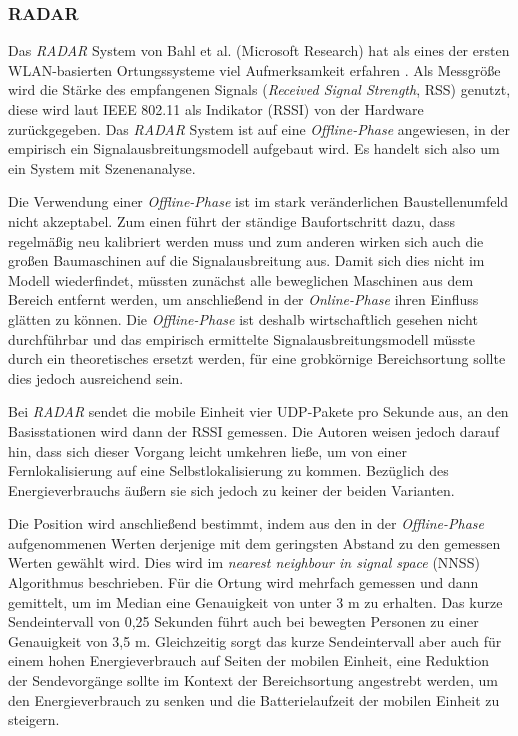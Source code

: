 \subsubsection{RADAR}
\label{ch:Vorherige:sec:RADAR}
Das \emph{RADAR} System von Bahl et al. (Microsoft Research) hat als eines der ersten WLAN-basierten Ortungssysteme viel Aufmerksamkeit erfahren \cite{bahl2000radar}.
Als Messgröße wird die Stärke des empfangenen Signals (\emph{Received Signal Strength}, RSS) genutzt, diese wird laut IEEE 802.11 als Indikator (RSSI) von der Hardware zurückgegeben. 
Das \emph{RADAR} System ist auf eine \emph{Offline-Phase} angewiesen, in der empirisch ein Signalausbreitungsmodell aufgebaut wird. 
Es handelt sich also um ein System mit Szenenanalyse.

Die Verwendung einer \emph{Offline-Phase} ist im stark veränderlichen Baustellenumfeld nicht akzeptabel. 
Zum einen führt der ständige Baufortschritt dazu, dass regelmäßig neu kalibriert werden muss und zum anderen wirken sich auch die großen Baumaschinen auf die Signalausbreitung aus. 
Damit sich dies nicht im Modell wiederfindet, müssten zunächst alle beweglichen Maschinen aus dem Bereich entfernt werden, um anschließend in der \emph{Online-Phase} ihren Einfluss glätten zu können.
Die \emph{Offline-Phase} ist deshalb wirtschaftlich gesehen nicht durchführbar und das empirisch ermittelte Signalausbreitungsmodell müsste durch ein theoretisches ersetzt werden, für eine grobkörnige Bereichsortung sollte dies jedoch ausreichend sein.

Bei \emph{RADAR} sendet die mobile Einheit vier UDP-Pakete pro Sekunde aus, an den Basisstationen wird dann der RSSI gemessen.
Die Autoren weisen jedoch darauf hin, dass sich dieser Vorgang leicht umkehren ließe, um von einer Fernlokalisierung auf eine Selbstlokalisierung zu kommen.
Bezüglich des Energieverbrauchs äußern sie sich jedoch zu keiner der beiden Varianten.

Die Position wird anschließend bestimmt, indem aus den in der \emph{Offline-Phase} aufgenommenen Werten derjenige mit dem geringsten Abstand zu den gemessen Werten gewählt wird. 
Dies wird im \emph{nearest neighbour in signal space} (NNSS) Algorithmus beschrieben.
Für die Ortung wird mehrfach gemessen und dann gemittelt, um im Median eine Genauigkeit von unter 3 m zu erhalten. 
Das kurze Sendeintervall von 0,25 Sekunden führt auch bei bewegten Personen zu einer Genauigkeit von 3,5 m.
Gleichzeitig sorgt das kurze Sendeintervall aber auch für einem hohen Energieverbrauch auf Seiten der mobilen Einheit, eine Reduktion der Sendevorgänge sollte im Kontext der Bereichsortung angestrebt werden, um den Energieverbrauch zu senken und die Batterielaufzeit der mobilen Einheit zu steigern.

